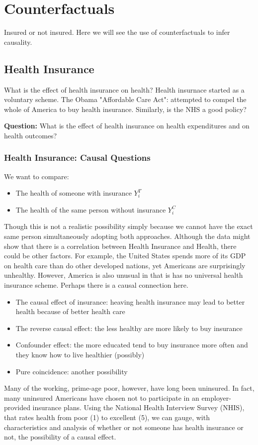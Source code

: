 \documentclass[12pt, letterpaper]{article}
\begin{document}
{\section{Counterfactuals}
Insured or not insured. Here we will see the use of counterfactuals to infer causality.

\subsection{Health Insurance}
What is the effect of health insurance on health? Health insurnace started as a voluntary scheme. The Obama "Affordable Care Act": attempted to compel the whole of America to buy health insurance. Similarly, is the NHS a good policy?


\textbf{Question:} What is the effect of health insurance on health expenditures and on health outcomes?

\subsubsection{Health Insurance: Causal Questions}
We want to compare:
\begin{itemize}
	\item The health of someone with insurance $Y_i^T$
	\item The health of the same person without insurance $Y_i^C$
\end{itemize}
Though this is not a realistic possibility simply because we cannot have the exact same person simultaneously adopting both approaches. Although the data might show that there is a correlation between Health Insurance and Health, there could be other factors. For example, the United States spends more of its GDP on health care than do other developed nations, yet Americans are surprisingly unhealthy. However, America is also unusual in that is has no universal health insurance scheme. Perhaps there is a causal connection here.
\begin{itemize}
	\item The causal effect of insurance: heaving health insurance may lead to better health because of better health care
	\item The reverse causal effect: the less healthy are more likely to buy insurance
	\item Confounder effect: the more educated tend to buy insurance more often and they know how to live healthier (possibly)
	\item Pure coincidence: another possibility
\end{itemize}
Many of the working, prime-age poor, however, have long been uninsured. In fact, many uninsured Americans have chosen not to participate in an employer-provided insurance plans. Using the National Health Interview Survey (NHIS), that rates health from poor (1) to excellent (5), we can gauge, with characteristics and analysis of whether or not someone has health insurance or not, the possibility of a causal effect.

}
\end{document}
